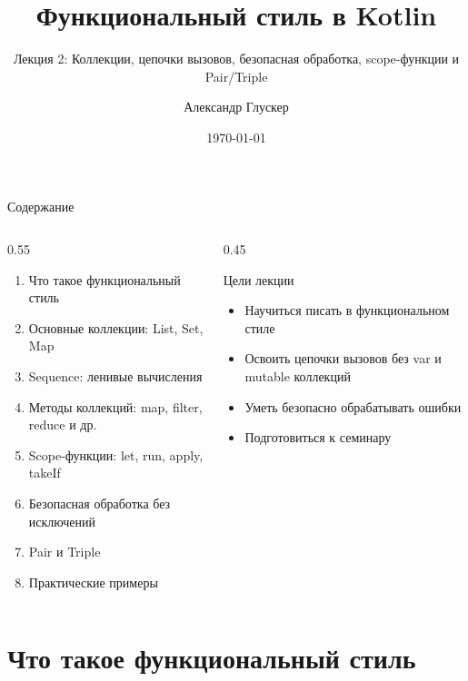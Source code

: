 \documentclass[aspectratio=169]{beamer}
\title{Функциональный стиль в Kotlin}
\subtitle{Лекция 2: Коллекции, цепочки вызовов, безопасная обработка, scope-функции и Pair/Triple}
\author{Александр Глускер}
\institute{Курс «Мобильная разработка»}
\date{\today}
\begin{document}
\begin{frame}
  \titlepage
\end{frame}

\begin{frame}{Содержание}
  \begin{columns}[T,onlytextwidth]
    \begin{column}{0.55\textwidth}
      \begin{enumerate}
        \item Что такое функциональный стиль
        \item Основные коллекции: List, Set, Map
        \item Sequence: ленивые вычисления
        \item Методы коллекций: map, filter, reduce и др.
        \item Scope-функции: let, run, apply, takeIf
        \item Безопасная обработка без исключений
        \item Pair и Triple
        \item Практические примеры
      \end{enumerate}
    \end{column}
    \begin{column}{0.45\textwidth}
      \begin{block}{Цели лекции}
        \begin{itemize}
          \item Научиться писать в функциональном стиле
          \item Освоить цепочки вызовов без var и mutable коллекций
          \item Уметь безопасно обрабатывать ошибки
          \item Подготовиться к семинару
        \end{itemize}
      \end{block}
    \end{column}
  \end{columns}
\end{frame}

\section{Что такое функциональный стиль}
\end{document}
